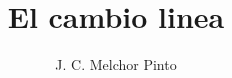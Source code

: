 \documentclass[12pt]{guia}
\title{El cambio linea}
\author{J. C. Melchor Pinto}
\begin{document}
\pagestyle{headandfoot}
\addpoints
\INFO

\begin{questions}
    
    
    
\end{questions}
\end{document}
